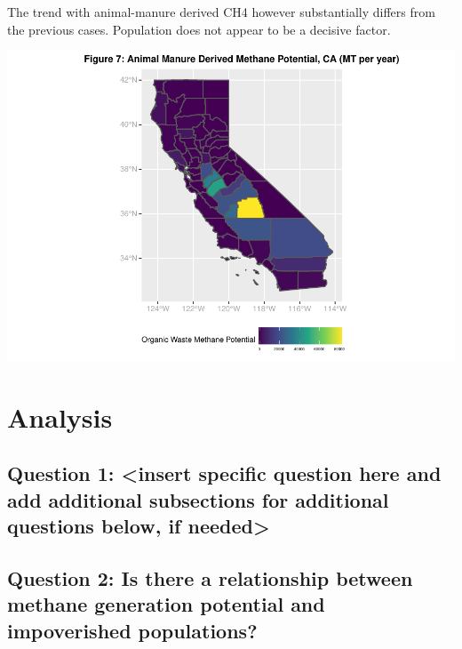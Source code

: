 \documentclass[
  12pt,
]{article}
\begin{document}
The trend with animal-manure derived CH4 however substantially differs
from the previous cases. Population does not appear to be a decisive
factor.

\includegraphics{FDR_ProjectReport_files/figure-latex/unnamed-chunk-6-1.pdf}

\newpage

\hypertarget{analysis}{%
\section{Analysis}\label{analysis}}

\hypertarget{question-1-insert-specific-question-here-and-add-additional-subsections-for-additional-questions-below-if-needed}{%
\subsection{Question 1: \textless insert specific question here and add
additional subsections for additional questions below, if
needed\textgreater{}}\label{question-1-insert-specific-question-here-and-add-additional-subsections-for-additional-questions-below-if-needed}}

\hypertarget{question-2-is-there-a-relationship-between-methane-generation-potential-and-impoverished-populations}{%
\subsection{Question 2: Is there a relationship between methane
generation potential and impoverished
populations?}\label{question-2-is-there-a-relationship-between-methane-generation-potential-and-impoverished-populations}}
\end{document}
